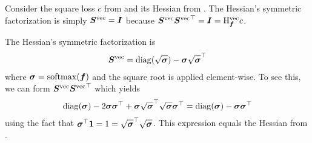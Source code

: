 \switchcolumn[1]
\begin{example}\label{ex:mseloss_hessian_factorization}
  Consider the square loss $c$ from  and its Hessian from .
  The Hessian's symmetric factorization is simply ${\bm{S}}^{\operatorname{vec}} = {\bm{I}}$ because ${\bm{S}}^{\operatorname{vec}} {{\bm{S}}^{\operatorname{vec}}}^{\top} = {\bm{I}} = \mathrm{H}_{{\bm{f}}}^{\operatorname{vec}}c$.
\end{example}

\begin{example}\label{ex:crossentropyloss_hessian_factorization}
  The Hessian's symmetric factorization is \citep[\eg][]{papyan2019measurements}
  \begin{align*}
    {\bm{S}}^{\operatorname{vec}} = \operatorname{diag}(\sqrt{{\bm{\sigma}}}) - {\bm{\sigma}} \sqrt{{\bm{\sigma}}}^{\top}
  \end{align*}
  where ${\bm{\sigma}} = \mathrm{softmax}({\bm{f}})$ and the square root is applied element-wise.
  To see this, we can form ${\bm{S}}^{\operatorname{vec}} {{\bm{S}}^{\operatorname{vec}}}^{\top}$ which yields
  \begin{align*}
    \operatorname{diag}({\bm{\sigma}}) - 2 {\bm{\sigma}} {\bm{\sigma}}^{\top} + {\bm{\sigma}} \sqrt{{\bm{\sigma}}}^{\top} \sqrt{{\bm{\sigma}}} {\bm{\sigma}}^{\top}
    = \operatorname{diag}({\bm{\sigma}}) - {\bm{\sigma}} {\bm{\sigma}}^{\top}
  \end{align*}
  using the fact that ${\bm{\sigma}}^{\top} {\bm{1}} = 1 = \sqrt{{\bm{\sigma}}}^{\top} \sqrt{{\bm{\sigma}}}$.
  This expression equals the Hessian from .
\end{example}

\switchcolumn[0]

